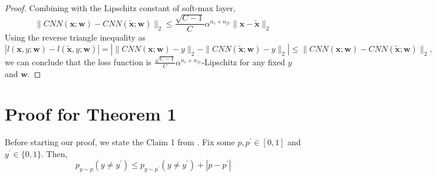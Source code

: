 \documentclass{article} %
\begin{document}
\begin{proof}
Combining with the Lipschitz constant of soft-max layer,
\[
\|CNN(\mathbf{x};\mathbf{w}) - CNN(\mathbf{\tilde{x}};\mathbf{w})\|_2 \leq   \frac{\sqrt{C-1}}{C} \alpha^{n_c+n_{fc}}  \|\mathbf{x}-\mathbf{\tilde{x}}\|_2
\]
Using the reverse triangle inequality as
\[
|l(\mathbf{x},y;\mathbf{w})-l(\mathbf{\tilde{x}},y;\mathbf{w})| = |\| CNN(\mathbf{x};\mathbf{w}) -y\|_2 -\|CNN(\mathbf{\tilde{x}};\mathbf{w})-y\|_2 | \leq \|CNN(\mathbf{x};\mathbf{w}) - CNN(\mathbf{\tilde{x}};\mathbf{w})\|_2,
\]
we can conclude that the loss function is $\frac{\sqrt{C-1}}{C} \alpha^{n_c+n_{fc}}$-Lipschitz for any fixed $y$ and $\mathbf{w}$.
\end{proof}

\section{Proof for Theorem 1}
Before starting our proof, we state the Claim 1 from \cite{BerlindU15}. Fix some $p,p^\prime \in [0,1]$ and $y^\prime \in \{0,1\}$. Then,
\[
p_{y \sim p}(y \neq y^\prime) \leq p_{y \sim p^\prime}(y \neq y^\prime) + |p - p^\prime|
\]
\end{document}
